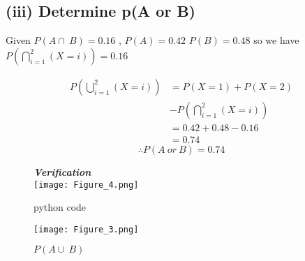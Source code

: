 \documentclass[journal,12pt,twocolumn]{article}
\newcommand{\bgunion}[3]{\bigcup_{#1}^{#2}#3}
\newcommand{\bginter}[3]{\bigcap_{#1}^{#2}#3}
\newcommand{\probunion}{P\left( \bgunion{i=1}{2}{(X=i)} \right)}
\newcommand{\probinter}{P\left( \bginter{i=1}{2}{(X=i)} \right)}
\begin{document}
\subsection*{(iii) Determine p(A or B)}
Given ${P(A \cap\ B) = 0.16}$ , ${P(A) = 0.42}$ 
${P(B) =0.48}$ so we have\\

${\probinter =0.16}$

\begin{align*}
    \probunion &=P(X=1) + P(X=2)\\ 
               & - \probinter \\   
                &= 0.42 + 0.48 - 0.16 \\  
                &= 0.74 
\end{align*}
\begin{equation}
    \therefore P(A\ or \ B) = 0.74 
\end{equation}

\begin{figure}
    \textbf{\textit{Verification}} \\
    \centering
    \texttt{[image: Figure\_4.png]}
    \caption*{python code}
    \label{fig_code}
\end{figure}

\begin{figure}[H]
    \centering
    \texttt{[image: Figure\_3.png]}
    \caption{$P(A \cup\ B)$}
    \label{fig:3}
\end{figure}
\end{document}
